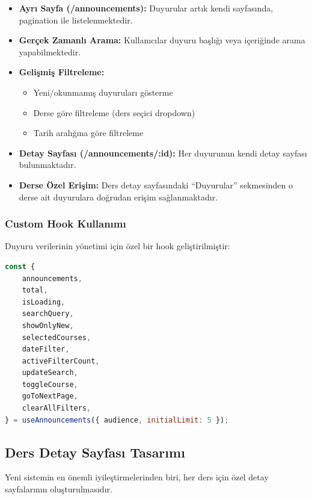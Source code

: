 \documentclass[12pt,a4paper]{article}
\begin{document}
\begin{itemize}
    \item \textbf{Ayrı Sayfa (/announcements):} Duyurular artık kendi sayfasında, pagination ile listelenmektedir.
    
    \item \textbf{Gerçek Zamanlı Arama:} Kullanıcılar duyuru başlığı veya içeriğinde arama yapabilmektedir.
    
    \item \textbf{Gelişmiş Filtreleme:}
    \begin{itemize}
        \item Yeni/okunmamış duyuruları gösterme
        \item Derse göre filtreleme (ders seçici dropdown)
        \item Tarih aralığına göre filtreleme
    \end{itemize}
    
    \item \textbf{Detay Sayfası (/announcements/:id):} Her duyurunun kendi detay sayfası bulunmaktadır.
    
    \item \textbf{Derse Özel Erişim:} Ders detay sayfasındaki ``Duyurular'' sekmesinden o derse ait duyurulara doğrudan erişim sağlanmaktadır.
\end{itemize}

\subsubsection{Custom Hook Kullanımı}

Duyuru verilerinin yönetimi için özel bir hook geliştirilmiştir:

\begin{lstlisting}[language=JavaScript, basicstyle=\ttfamily\small]
const {
    announcements,
    total,
    isLoading,
    searchQuery,
    showOnlyNew,
    selectedCourses,
    dateFilter,
    activeFilterCount,
    updateSearch,
    toggleCourse,
    goToNextPage,
    clearAllFilters,
} = useAnnouncements({ audience, initialLimit: 5 });
\end{lstlisting}

\subsection{Ders Detay Sayfası Tasarımı}

Yeni sistemin en önemli iyileştirmelerinden biri, her ders için özel detay sayfalarının oluşturulmasıdır.
\end{document}

